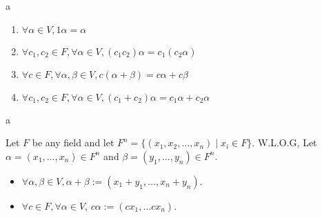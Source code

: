 \documentclass[8pt]{beamer}
\begin{document}
\begin{frame}{a}
\begin{definition}
\begin{enumerate}
\begin{enumerate}
            \item $\forall \alpha \in V, 1 \alpha = \alpha$
            \item $\forall c_1, c_2 \in F, \forall \alpha \in V, (c_1 c_2) \alpha = c_1 (c_2 \alpha)$
            \item $\forall c \in F, \forall \alpha, \beta \in V, c(\alpha+ \beta) = c\alpha + c\beta $
            \item $\forall c_1, c_2 \in F, \forall \alpha  \in V, (c_1 + c_2) \alpha = c_1 \alpha + c_2 \alpha$
        \end{enumerate}
        \end{enumerate}
    \end{definition}
\end{frame}

\begin{frame}{a}
    \begin{example}
        Let $F$ be any field and let $F^n = \{ (x_1, x_2, \dots, x_n) \mid x_i \in F\}$. W.L.O.G, Let $\alpha = (x_1, \dots, x_n) \in F^n$ and $\beta = (y_1, \dots, y_n) \in F^n$.
        \begin{itemize}
            \item $\forall \alpha, \beta \in V, \alpha + \beta := (x_1 + y_1 ,\dots , x_n+y_n)$.
            \item $\forall c \in F, \forall \alpha \in V$, $c \alpha := (cx_1, \dots cx_n) $.
        \end{itemize}
    \end{example}


\end{frame}
\end{document}
